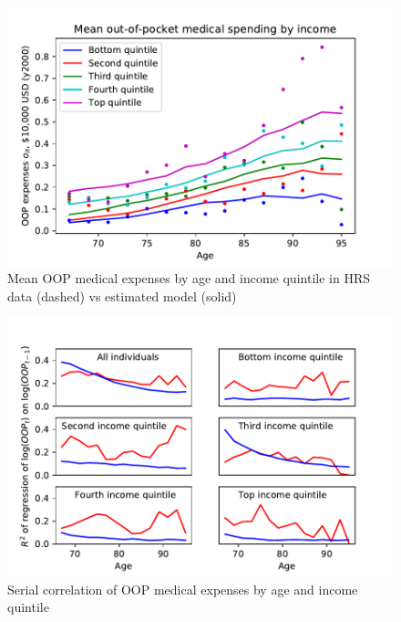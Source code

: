 \documentclass[12pt,pdftex,letterpaper]{article}
\begin{document}
\begin{figure}[h!]
\begin{center}
\includegraphics[scale=0.9]{../Figures/OOPbyIncAge.pdf}
\end{center}
\vspace{-0.5cm}
\caption{Mean OOP medical expenses by age and income quintile in HRS data (dashed) vs estimated model (solid)}
\label{fig:OOPbyIncAge}
\end{figure}

\begin{figure}[h!]
\begin{center}
\includegraphics[scale=0.9]{../Figures/SerialCorrOOP.pdf}
\end{center}
\vspace{-0.5cm}
\caption{Serial correlation of OOP medical expenses by age and income quintile}
\label{fig:SerialCorrOOP}
\end{figure}
\end{document}
